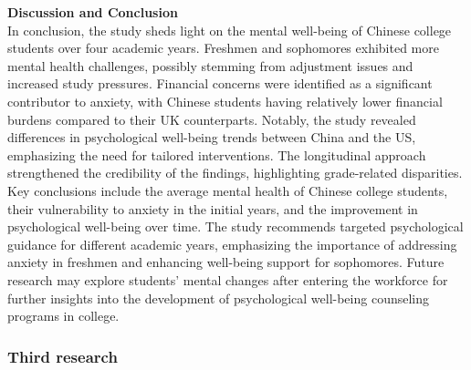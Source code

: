 \documentclass[11pt]{report}
\begin{document}
\textbf{Discussion and Conclusion} \\
In conclusion, the study sheds light on the mental well-being of Chinese college students over four academic years. Freshmen and sophomores exhibited more mental health challenges, possibly stemming from adjustment issues and increased study pressures. Financial concerns were identified as a significant contributor to anxiety, with Chinese students having relatively lower financial burdens compared to their UK counterparts. Notably, the study revealed differences in psychological well-being trends between China and the US, emphasizing the need for tailored interventions. The longitudinal approach strengthened the credibility of the findings, highlighting grade-related disparities. Key conclusions include the average mental health of Chinese college students, their vulnerability to anxiety in the initial years, and the improvement in psychological well-being over time. The study recommends targeted psychological guidance for different academic years, emphasizing the importance of addressing anxiety in freshmen and enhancing well-being support for sophomores. Future research may explore students' mental changes after entering the workforce for further insights into the development of psychological well-being counseling programs in college.

\subsubsection{Third research}
\end{document}
